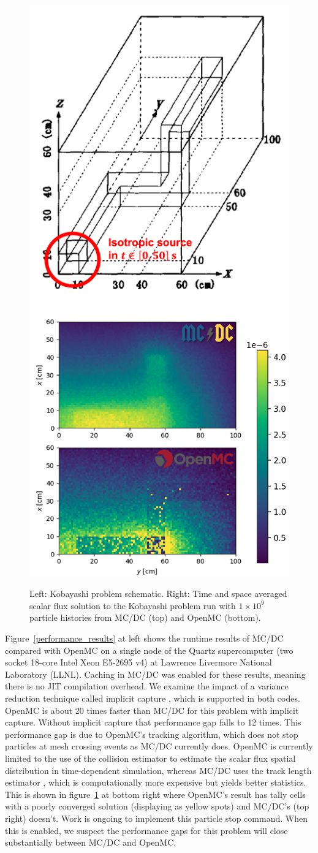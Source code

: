 \begin{figure}[h]
    \centering
    \includegraphics[width=.4\textwidth]{figures/results/kobayashi_problem.png} \hspace{1cm}
    \includegraphics[width=.5\textwidth]{figures/results/koby_mcdcopenmc.png}
    \caption{Left: Kobayashi problem schematic. Right: Time and space averaged scalar flux solution to the Kobayashi problem run with $1\times 10^{9}$ particle histories from MC/DC (top) and OpenMC (bottom).}
    \label{koby-problem}
\end{figure}

Figure~\ref{performance_results} at left shows the runtime results of MC/DC compared with OpenMC on a single node of the Quartz supercomputer (two socket 18-core Intel Xeon E5-2695 v4) at Lawrence Livermore National Laboratory (LLNL).
Caching in MC/DC was enabled for these results, meaning there is no JIT compilation overhead.
We examine the impact of a variance reduction technique called implicit capture \cite{lewis_computational_1984}, which is supported in both codes.
OpenMC is about 20 times faster than MC/DC for this problem with implicit capture.
Without implicit capture that performance gap falls to 12 times.
This performance gap is due to OpenMC's tracking algorithm, which does not stop particles at mesh crossing events as MC/DC currently does.
OpenMC is currently limited to the use of the collision estimator to estimate the scalar flux spatial distribution in time-dependent simulation, whereas MC/DC uses the track length estimator \cite{lewis_computational_1984}, which is computationally more expensive but yields better statistics.
This is shown in figure~\ref{koby-problem} at bottom right where OpenMC's result has tally cells with a poorly converged solution (displaying as yellow spots) and MC/DC's (top right) doesn't.
Work is ongoing to implement this particle stop command.
When this is enabled, we suspect the performance gaps for this problem will close substantially between MC/DC and OpenMC.

